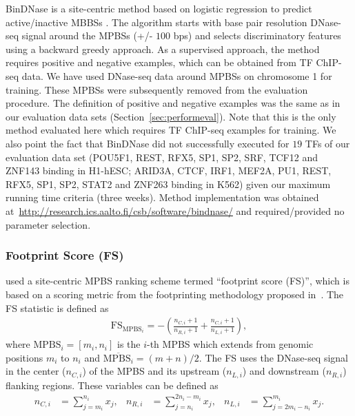 \documentclass[11pt]{article}
\begin{document}
BinDNase is a site-centric method based on logistic regression to predict active/inactive MBBSs \citep{kahara2015}. The algorithm starts with base pair resolution DNase-seq signal around the MPBSs (+/- $100$ bps) and selects discriminatory features using a backward greedy approach. As a supervised approach, the method requires positive and negative examples, which can be obtained from TF ChIP-seq data. We have used DNase-seq data around MPBSs on chromosome 1 for training. These MPBSs were subsequently removed from the evaluation procedure. The definition of positive and negative examples was the same as in our evaluation data sets (Section~\ref{sec:performeval}). Note that this is the only method evaluated here which requires TF ChIP-seq examples for training. We also point the fact that BinDNase did not successfully executed for $19$ TFs of our evaluation data set (POU5F1, REST, RFX5, SP1, SP2, SRF, TCF12 and ZNF143 binding in H1-hESC; ARID3A, CTCF, IRF1, MEF2A, PU1, REST, RFX5, SP1, SP2, STAT2 and ZNF263 binding in K562) given our maximum running time criteria (three weeks). Method implementation was obtained at~\url{http://research.ics.aalto.fi/csb/software/bindnase/} and required/provided no parameter selection.

\subsubsection{Footprint Score (FS)}
\label{sec:fs}

\cite{he2014} used a site-centric MPBS ranking scheme termed ``footprint score (FS)'', which is based on a scoring metric from the footprinting methodology proposed in~\cite{neph2012a}. The FS statistic is defined as
\begin{align}
\text{FS}_{\text{MPBS}_{i}} = -\left(\frac{{n}_{C,i}+1}{{n}_{R,i}+1} + \frac{{n}_{C,i}+1}{{n}_{L,i}+1}\right),
\label{eq:fs1}
\end{align}
where $\text{MPBS}_{i} = [{m}_{i},{n}_{i}]$ is the $i$-th MPBS which extends from genomic positions ${m}_{i}$ to ${n}_{i}$ and $\overline{\text{MPBS}_{i}} = (m+n)/2$. The FS uses the DNase-seq signal in the center (${n}_{C,i}$) of the MPBS and its upstream (${n}_{L,i}$) and downstream (${n}_{R,i}$) flanking regions. These variables can be defined as
\begin{align}
{n}_{C,i} &= \sum_{j={m}_{i}}^{{n}_{i}} {x}_{j}, &
{n}_{R,i} &= \sum_{j={n}_{i}}^{2{n}_{i}-{m}_{i}} {x}_{j}, &
{n}_{L,i} &= \sum_{j=2{m}_{i}-{n}_{i}}^{{m}_{i}} {x}_{j}.
\label{eq:fs2}
\end{align}
\end{document}
